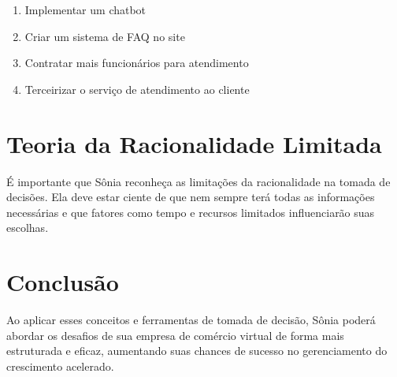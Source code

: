 \documentclass[11pt]{article}
\begin{document}
\begin{enumerate}
    \item Implementar um chatbot
    \item Criar um sistema de FAQ no site
    \item Contratar mais funcionários para atendimento
    \item Terceirizar o serviço de atendimento ao cliente
\end{enumerate}

\section{Teoria da Racionalidade Limitada}

É importante que Sônia reconheça as limitações da racionalidade na tomada de decisões. Ela deve estar ciente de que nem sempre terá todas as informações necessárias e que fatores como tempo e recursos limitados influenciarão suas escolhas.

\section{Conclusão}

Ao aplicar esses conceitos e ferramentas de tomada de decisão, Sônia poderá abordar os desafios de sua empresa de comércio virtual de forma mais estruturada e eficaz, aumentando suas chances de sucesso no gerenciamento do crescimento acelerado.
\end{document}

